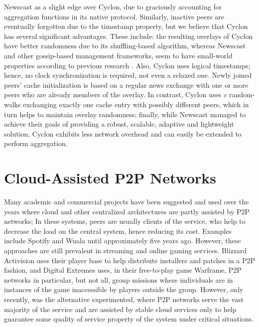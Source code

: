 \documentclass[runningheads]{llncs}
\begin{document}
Newscast as a slight edge over Cyclon, due to graciously accounting for aggregation functions in its native protocol. Similarly, inactive peers are eventually forgotten due to the timestamp property, but we believe that Cyclon has several significant advantages. These include: the resulting overlays of Cyclon have better randomness due to its shuffling-based algorithm, whereas Newscast and other gossip-based management frameworks, seem to have small-world properties according to previous research \cite{eval-gossip-based}. Also, Cyclon uses logical timestamps; hence, no clock synchronization is required, not even a relaxed one. Newly joined peers' cache initialization is based on a regular news exchange with one or more peers who are already members of the overlay. In contrast, Cyclon uses \textit{c} random-walks exchanging exactly one cache entry with possibly different peers, which in turn helps to maintain overlay randomness; finally, while Newscast managed to achieve their goals of providing a robust, scalable, adaptive and lightweight solution, Cyclon exhibits less network overhead and can easily be extended to perform aggregation.

\newpage\section{Cloud-Assisted P2P Networks}\label{sec:ca-networks}

Many academic and commercial projects have been suggested and used over the years where cloud and other centralized architectures are partly assisted by P2P networks; In these systems, peers are usually clients of the service, who help to decrease the load on the central system, hence reducing its cost. Examples include Spotify and Wuala until approximately five years ago. However, these approaches are still prevalent in streaming and online gaming services. Blizzard Activision uses their player base to help distribute installers and patches in a P2P fashion, and Digital Extremes uses, in their free-to-play game Warframe, P2P networks in particular, but not all, group missions where individuals are in instances of the game inaccessible by players outside the group. However, only recently, was the alternative experimented, where P2P networks serve the vast majority of the service and are assisted by stable cloud services only to help guarantee some quality of service property of the system under critical situations.
\end{document}
